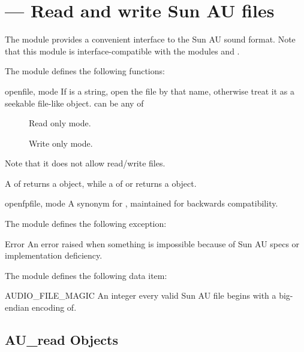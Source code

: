 \section{ ---
         Read and write Sun AU files}


The  module provides a convenient interface to the Sun AU sound
format. Note that this module is interface-compatible with the modules
 and .

The  module defines the following functions:

\begin{funcdesc}{open}{file, mode}
If  is a string, open the file by that name, otherwise treat it
as a seekable file-like object.  can be any of
\begin{description}
	\item[] Read only mode.
	\item[] Write only mode.
\end{description}
Note that it does not allow read/write files.

A  of  returns a 
object, while a  of  or  returns
a  object.
\end{funcdesc}

\begin{funcdesc}{openfp}{file, mode}
A synonym for , maintained for backwards compatibility.
\end{funcdesc}

The  module defines the following exception:

\begin{excdesc}{Error}
An error raised when something is impossible because of Sun AU specs or 
implementation deficiency.
\end{excdesc}

The  module defines the following data item:

\begin{datadesc}{AUDIO_FILE_MAGIC}
An integer every valid Sun AU file begins with a big-endian encoding of.
\end{datadesc}


\subsection{AU_read Objects \label{au-read-objects}}

